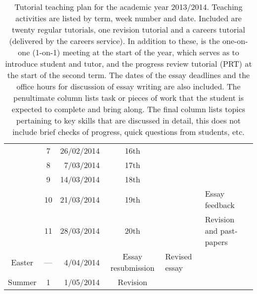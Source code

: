 \begin{table}
\begin{tabular}{c c r c l l}
			 & \hphantom{0}7 &	26/02/2014 & 16th		&			& \\
			 & \hphantom{0}8 &	 7/03/2014 & 17th		&			& \\
			 & \hphantom{0}9 &	14/03/2014 & 18th		&			& \\
			 & 10		 &	21/03/2014 & 19th		&			& Essay feedback \\
			 & 11		 &	28/03/2014 & 20th		&			& Revision and past-papers \\
\midrule
\multirow{1}{*}{Easter} & \multicolumn{1}{c}{---} & 4/04/2014 & Essay resubmission & Revised essay	& \\
\midrule
\multirow{1}{*}{Summer}	 & \hphantom{0}1 &	 1/05/2014 & Revision		&			& \\
 \bottomrule
\end{tabular}
\caption{Tutorial teaching plan for the academic year 2013/2014. Teaching activities are listed by term, week number and date. Included are twenty regular tutorials, one revision tutorial and a careers tutorial (delivered by the careers service). In addition to these, is the one-on-one (1-on-1) meeting at the start of the year, which serves as to introduce student and tutor, and the progress review tutorial (PRT) at the start of the second term. The dates of the essay deadlines and the office hours for discussion of essay writing are also included. The penultimate column lists task or pieces of work that the student is expected to complete and bring along. The final column lists topics pertaining to key skills that are discussed in detail, this does not include brief checks of progress, quick questions from students, etc.}\label{tab:2013-14}
\end{table}


